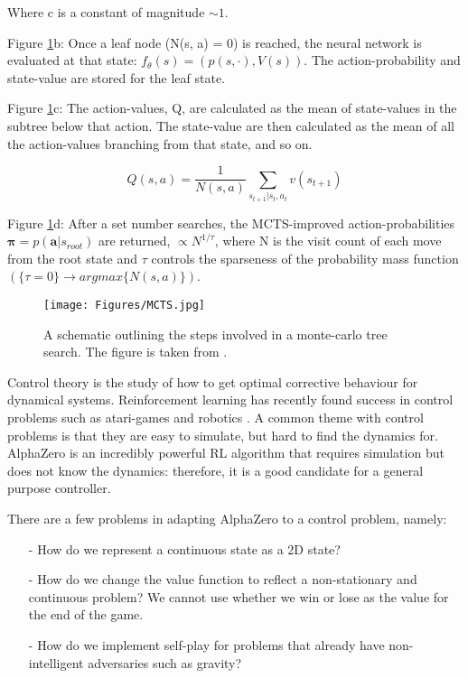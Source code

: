\documentclass[a4paper]{article}
\begin{document}
Where c is a constant of magnitude $\sim 1$.

Figure \ref{fig:MCTS}b:
Once a leaf node (N(s, a) = 0) is reached, the neural network is evaluated at that state: $f_\theta (s) = (p(s, \cdot), V(s))$. The action-probability and state-value are stored for the leaf state.

Figure \ref{fig:MCTS}c:
The action-values, Q, are calculated as the mean of state-values in the subtree below that action. The state-value are then calculated as the mean of all the action-values branching from that state, and so on.

\begin{equation}
   Q(s, a) = \frac{1}{N(s, a)} \sum_{s_{t+1} | s_t, a_t} v(s_{t+1})
   \label{eqn:actionvalue}
\end{equation}

Figure \ref{fig:MCTS}d:
After a set number searches, the MCTS-improved action-probabilities $\boldsymbol{\pi} = p(\boldsymbol{a} | s_{root})$ are returned, $\propto N^{1/\tau}$, where N is the visit count of each move from the root state and $\tau$ controls the sparseness of the probability mass function $(\{\tau = 0\} \rightarrow argmax\{N(s, a)\})$.

\begin{figure}[H]
   \centering
   \texttt{[image: Figures/MCTS.jpg]}
   \caption{\label{fig:MCTS} A schematic outlining the steps involved in a monte-carlo tree search. The figure is taken from \cite{AlphaGoZero}.}
\end{figure}

Control theory is the study of how to get optimal corrective behaviour for dynamical systems. Reinforcement learning has recently found success in control problems such as atari-games and robotics \cite{RLoverview}. A common theme with control problems is that they are easy to simulate, but hard to find the dynamics for. AlphaZero is an incredibly powerful RL algorithm that requires simulation but does not know the dynamics: therefore, it is a good candidate for a general purpose controller.

There are a few problems in adapting AlphaZero to a control problem, namely:
\begin{itemize}
   \item[-] How do we represent a continuous state as a 2D state?
   \item[-] How do we change the value function to reflect a non-stationary and continuous problem? We cannot use whether we win or lose as the value for the end of the game.
   \item[-] How do we implement self-play for problems that already have non-intelligent adversaries such as gravity?
\end{itemize}
\end{document}
